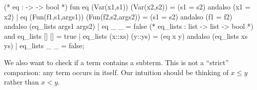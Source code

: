 \nwenddocs{}\endmoddef\nwstartdeflinemarkup{}\nwenddeflinemarkup
(* eq :  ->  -> bool *)
fun eq (Var(x1,s1)) (Var(x2,s2)) = (s1 = s2) andalso (x1 = x2)
  | eq (Fun(f1,s1,args1)) (Fun(f2,s2,args2)) =
      (s1 = s2) andalso (f1 = f2) andalso (eq_lists args1 args2)
  | eq _ _ = false
(* eq_lists :  list ->  list -> bool *)
and eq_lists [] [] = true
  | eq_lists (x::xs) (y::ys) = (eq x y) andalso (eq_lists xs ys)
  | eq_lists _ _ = false;
\eatline
{}\nwendcode{}\nwdocspar
\begin{node}
We also want to check if a term contains a subterm. This is not a
``strict'' comparison: any term occurs in itself.
Our intuition should be thinking of $x\leq y$ rather than $x<y$. 
\end{node}

